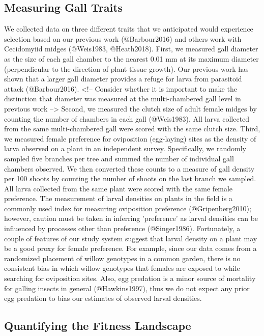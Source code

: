 \documentclass[11pt]{article}
\begin{document}
\subsection*{Measuring Gall Traits}

We collected data on three different traits that we anticipated would experience selection based on our previous work (@Barbour2016) and others work with Cecidomyiid midges (@Weis1983, @Heath2018). 
First, we measured gall diameter as the size of each gall chamber to the nearest 0.01 mm at its maximum diameter (perpendicular to the direction of plant tissue growth). 
Our previous work has shown that a larger gall diameter provides a refuge for larva from parasitoid attack (@Barbour2016). <!-- Consider whether it is important to make the distinction that diameter was measured at the multi-chambered gall level in previous work -->
Second, we measured the clutch size of adult female midges by counting the number of chambers in each gall (@Weis1983). 
All larva collected from the same multi-chambered gall were scored with the same clutch size. 
Third, we measured female preference for oviposition (egg-laying) sites as the density of larva observed on a plant in an independent survey. Specifically, we randomly sampled five branches per tree and summed the number of individual gall chambers observed. We then converted these counts to a measure of gall density per 100 shoots by counting the number of shoots on the last branch we sampled. All larva collected from the same plant were scored with the same female preference.
The measurement of larval densities on plants in the field is a commonly used index for measuring oviposition preference (@Gripenberg2010); however, caution must be taken in inferring 'preference' as larval densities can be influenced by processes other than preference (@Singer1986). Fortunately, a couple of features of our study system suggest that larval density on a plant may be a good proxy for female preference. For example, since our data comes from a randomized placement of willow genotypes in a common garden, there is no consistent bias in which willow genotypes that females are exposed to while searching for oviposition sites. Also, egg predation is a minor source of mortality for galling insects in general (@Hawkins1997), thus we do not expect any prior egg predation to bias our estimates of observed larval densities. 

\subsection*{Quantifying the Fitness Landscape}
\end{document}
